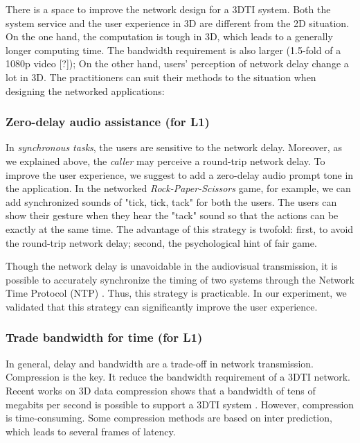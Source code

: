 There is a space to improve the network design for a 3DTI system. Both the system service and the user experience in 3D are different from the 2D situation. On the one hand, the computation is tough in 3D, which leads to a generally longer computing time. The bandwidth requirement is also larger (1.5-fold of a 1080p video [?]); On the other hand, users' perception of network delay change a lot in 3D. The practitioners can suit their methods to the situation when designing the networked applications:

\subsubsection{Zero-delay audio assistance (for L1)}
    
In \emph{synchronous tasks}, the users are sensitive to the network delay. Moreover, as we explained above, the \emph{caller} may perceive a round-trip network delay. To improve the user experience, we suggest to add a zero-delay audio prompt tone in the application. In the networked \emph{Rock-Paper-Scissors} game, for example, we can add synchronized sounds of "tick, tick, tack" for both the users. The users can show their gesture when they hear the "tack" sound so that the actions can be exactly at the same time. The advantage of this strategy is twofold: first, to avoid the round-trip network delay; second, the psychological hint of fair game.
    
Though the network delay is unavoidable in the audiovisual transmission, it is possible to accurately synchronize the timing of two systems through the Network Time Protocol (NTP) \cite{mills1991internet}. Thus, this strategy is practicable. In our experiment, we validated that this strategy can significantly improve the user experience.
    
\subsubsection{Trade bandwidth for time (for L1)}
    
In general, delay and bandwidth are a trade-off in network transmission. Compression is the key. It reduce the bandwidth requirement of a 3DTI network. Recent works on 3D data compression shows that a bandwidth of tens of megabits per second is possible to support a 3DTI system \cite{collet2015high, de2016compression}. However, compression is time-consuming. Some compression methods are based on inter prediction, which leads to several frames of latency.
    
